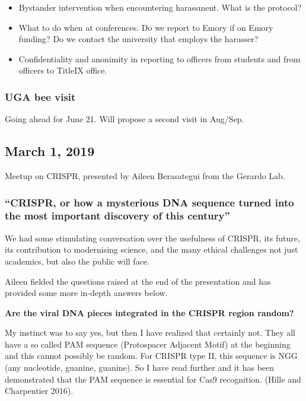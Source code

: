 \documentclass[10,portrait]{article}
\providecommand{\tightlist}{%
  \setlength{\itemsep}{0pt}\setlength{\parskip}{0pt}}
\begin{document}
\begin{itemize}
\tightlist
\item
  Bystander intervention when encountering harassment. What is the
  protocol?\\
\item
  What to do when at conferences. Do we report to Emory if on Emory
  funding? Do we contact the university that employs the harasser?\\
\item
  Confidentiality and anonimity in reporting to officers from students
  and from officers to TitleIX office.
\end{itemize}

\subsubsection{UGA bee visit}\label{uga-bee-visit}

Going ahead for June 21. Will propose a second visit in Aug/Sep.

\newpage    

\subsection{March 1, 2019}\label{march-1-2019}

Meetup on CRISPR, presented by Aileen Berasategui from the Gerardo Lab.

\subsubsection{\texorpdfstring{``CRISPR, or how a mysterious DNA
sequence turned into the most important discovery of this
century''}{CRISPR, or how a mysterious DNA sequence turned into the most important discovery of this century}}\label{crispr-or-how-a-mysterious-dna-sequence-turned-into-the-most-important-discovery-of-this-century}

We had some stimulating conversation over the usefulness of CRISPR, its
future, its contribution to modernising science, and the many ethical
challenges not just academics, but also the public will face.

Aileen fielded the questions raised at the end of the presentation and
has provided some more in-depth answers below.

\textbf{Are the viral DNA pieces integrated in the CRISPR region
random?}

My instinct was to say yes, but then I have realized that certainly not.
They all have a so called PAM sequence (Protospacer Adjacent Motif) at
the beginning and this cannot possibly be random. For CRISPR type II,
this sequence is NGG (any nucleotide, guanine, guanine). So I have read
further and it has been demonstrated that the PAM sequence is essential
for Cas9 recognition. (Hille and Charpentier 2016).
\end{document}
